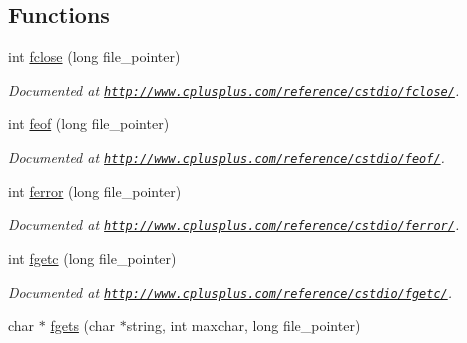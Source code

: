 \subsection*{Functions}
\begin{DoxyCompactItemize}
\item 
\hypertarget{group__file_ga9f376cee93d3084b7b951034ba8e0dbf}{int \hyperlink{group__file_ga9f376cee93d3084b7b951034ba8e0dbf}{fclose} (long file\-\_\-pointer)}\label{group__file_ga9f376cee93d3084b7b951034ba8e0dbf}

\begin{DoxyCompactList}\small\item\em Documented at \href{http://www.cplusplus.com/reference/cstdio/fclose/}{\tt http\-://www.\-cplusplus.\-com/reference/cstdio/fclose/}. \end{DoxyCompactList}\item 
\hypertarget{group__file_gac8d8490cf277f4aeb35d2f907be6c9df}{int \hyperlink{group__file_gac8d8490cf277f4aeb35d2f907be6c9df}{feof} (long file\-\_\-pointer)}\label{group__file_gac8d8490cf277f4aeb35d2f907be6c9df}

\begin{DoxyCompactList}\small\item\em Documented at \href{http://www.cplusplus.com/reference/cstdio/feof/}{\tt http\-://www.\-cplusplus.\-com/reference/cstdio/feof/}. \end{DoxyCompactList}\item 
\hypertarget{group__file_ga716c31e8dd4fad8e5111da39446fa5ba}{int \hyperlink{group__file_ga716c31e8dd4fad8e5111da39446fa5ba}{ferror} (long file\-\_\-pointer)}\label{group__file_ga716c31e8dd4fad8e5111da39446fa5ba}

\begin{DoxyCompactList}\small\item\em Documented at \href{http://www.cplusplus.com/reference/cstdio/ferror/}{\tt http\-://www.\-cplusplus.\-com/reference/cstdio/ferror/}. \end{DoxyCompactList}\item 
\hypertarget{group__file_gaf91145648fcc4e34d1e696fa7433616a}{int \hyperlink{group__file_gaf91145648fcc4e34d1e696fa7433616a}{fgetc} (long file\-\_\-pointer)}\label{group__file_gaf91145648fcc4e34d1e696fa7433616a}

\begin{DoxyCompactList}\small\item\em Documented at \href{http://www.cplusplus.com/reference/cstdio/fgetc/}{\tt http\-://www.\-cplusplus.\-com/reference/cstdio/fgetc/}. \end{DoxyCompactList}\item 
\hypertarget{group__file_ga0e7328e0c0e9a8eaac30b7211b309ae3}{char $\ast$ \hyperlink{group__file_ga0e7328e0c0e9a8eaac30b7211b309ae3}{fgets} (char $\ast$string, int maxchar, long file\-\_\-pointer)}\label{group__file_ga0e7328e0c0e9a8eaac30b7211b309ae3}


\end{DoxyCompactItemize}
